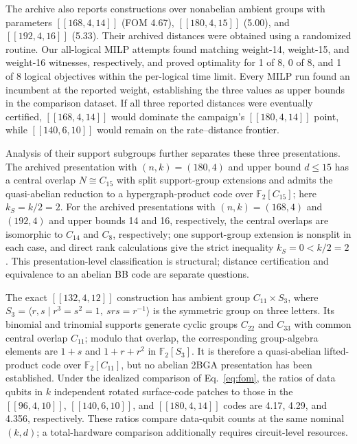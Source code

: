 \documentclass[aps,prx,twocolumn,superscriptaddress,nofootinbib,floatfix]{revtex4-2}
\newcommand{\FF}{\ensuremath{\mathbb{F}}}
\newcommand{\code}[1]{\ensuremath{\left[\!\left[#1\right]\!\right]}}
\begin{document}
The archive also reports constructions over nonabelian ambient groups with
parameters $\code{168,4,14}$ (FOM 4.67), $\code{180,4,15}$ (5.00), and
$\code{192,4,16}$ (5.33).  Their archived distances were obtained using a
randomized routine.
Our all-logical MILP attempts found matching weight-14, weight-15, and weight-16
witnesses, respectively, and proved optimality for 1 of 8, 0 of 8, and 1 of 8
logical objectives within the per-logical time limit.  Every MILP run found an
incumbent at the reported weight, establishing the three values as upper bounds
in the comparison dataset.  If all three
reported distances were eventually certified, $\code{168,4,14}$ would dominate
the campaign's $\code{180,4,14}$ point, while $\code{140,6,10}$ would remain on
the rate--distance frontier.

Analysis of their support subgroups further separates these three
presentations.  The archived presentation with $(n,k)=(180,4)$ and upper bound
$d\leq15$ has a central overlap $N\cong C_{15}$ with split support-group extensions
and admits the quasi-abelian
reduction to a hypergraph-product code over $\FF_2[C_{15}]$; here
$k_S=k/2=2$.  For the archived presentations with $(n,k)=(168,4)$ and
$(192,4)$ and upper bounds 14 and 16, respectively, the central overlaps are
isomorphic to $C_{14}$ and $C_8$, respectively; one support-group extension is
nonsplit in each case, and direct rank calculations
give the strict inequality $k_S=0<k/2=2$.  This presentation-level
classification is structural; distance certification and equivalence to an
abelian BB code are separate questions.

The exact $\code{132,4,12}$ construction has ambient group $C_{11}\times S_3$,
where $S_3=\langle r,s\mid r^3=s^2=1,\ srs=r^{-1}\rangle$ is the symmetric
group on three letters.  Its binomial and trinomial supports generate cyclic
groups $C_{22}$ and $C_{33}$ with common central overlap $C_{11}$; modulo that
overlap, the corresponding group-algebra elements are $1+s$ and $1+r+r^2$ in
$\FF_2[S_3]$.  It is therefore a quasi-abelian
lifted-product code over $\FF_2[C_{11}]$, but no abelian 2BGA presentation has
been established.  Under the
idealized comparison of Eq.~\eqref{eq:fom}, the ratios of data qubits in $k$
independent rotated surface-code patches to those in the $\code{96,4,10}$,
$\code{140,6,10}$, and $\code{180,4,14}$ codes are 4.17, 4.29, and 4.356,
respectively.  These ratios compare data-qubit counts at the same nominal
$(k,d)$; a total-hardware comparison additionally requires circuit-level
resources.
\end{document}
